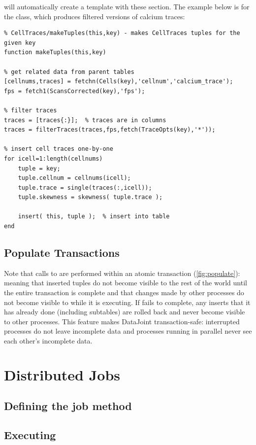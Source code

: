 \documentclass[10pt]{article}
\begin{document}
 will automatically create a template with these section.  The example below is for the  class, which produces filtered versions of calcium traces:
\begin{lstlisting}
% CellTraces/makeTuples(this,key) - makes CellTraces tuples for the given key
function makeTuples(this,key)   

% get related data from parent tables
[cellnums,traces] = fetchn(Cells(key),'cellnum','calcium_trace');
fps = fetch1(ScansCorrected(key),'fps');

% filter traces
traces = [traces{:}];  % traces are in columns
traces = filterTraces(traces,fps,fetch(TraceOpts(key),'*'));

% insert cell traces one-by-one
for icell=1:length(cellnums)
    tuple = key;
    tuple.cellnum = cellnums(icell);
    tuple.trace = single(traces(:,icell));
    tuple.skewness = skewness( tuple.trace );
    
    insert( this, tuple );  % insert into table
end
\end{lstlisting}



\subsection{Populate Transactions}
Note that calls to  are performed within an atomic transaction (\autoref{fig:populate}): meaning that inserted tuples do not become visible to the rest of the world until the entire transaction is complete and that changes made by other processes do not become visible to  while it is executing.  If  fails to complete, any inserts that it has already done (including subtables) are rolled back and never become visible to other processes.  This feature makes DataJoint transaction-safe: interrupted processes do not leave incomplete data and processes running in parallel never see each other's incomplete data.


\section{Distributed Jobs}
\subsection{Defining the job method}
\subsection{Executing }
\end{document}
